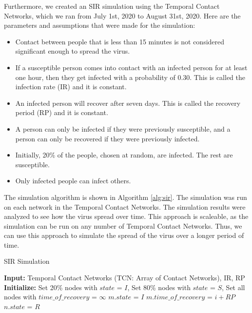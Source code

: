\documentclass[times, 10pt,twocolumn]{article}
\begin{document}
Furthermore, we created an SIR simulation using the Temporal Contact Networks, which we ran from July 1st, 2020 to August 31st, 2020. Here are the parameters and assumptions that were made for the simulation:
\begin{itemize}[itemsep=0pt]
    \item Contact between people that is less than 15 minutes is not considered significant enough to spread the virus.
    \item If a susceptible person comes into contact with an infected person for at least one hour, then they get infected with a probability of 0.30. This is called the infection rate (IR) and it is constant.
    \item An infected person will recover after seven days. This is called the recovery period (RP) and it is constant.
    \item A person can only be infected if they were previously susceptible, and a person can only be recovered if they were previously infected.
    \item Initially, 20\% of the people, chosen at random, are infected. The rest are susceptible.
    \item Only infected people can infect others.
\end{itemize}

The simulation algorithm is shown in Algorithm \ref{alg:sir}. The simulation was run on each network in the Temporal Contact Networks. The simulation results were analyzed to see how the virus spread over time. This approach is scaleable, as the simulation can be run on any number of Temporal Contact Networks. Thus, we can use this approach to simulate the spread of the virus over a longer period of time.

\begin{algorithm}
\caption{SIR Simulation}
\label{alg:sir}
\begin{minipage}{\linewidth}
\scriptsize
\begin{algorithmic}
    \STATE \textbf{Input:} Temporal Contact Networks (TCN: Array of Contact Networks), IR, RP
    \STATE \textbf{Initialize:} Set 20\% nodes with $state$ = $I$, Set 80\% nodes with $state$ = $S$, Set all nodes with $time\_of\_recovery$ = $\infty$
                \STATE $m.state$ = $I$
                \STATE $m.time\_of\_recovery$ = $i + RP$
            \ENDIF
        \ENDFOR
            \STATE $n.state$ = $R$
        \ENDIF
    \ENDFOR
\ENDFOR
\end{algorithmic}
\end{minipage}
\end{algorithm}
\end{document}
